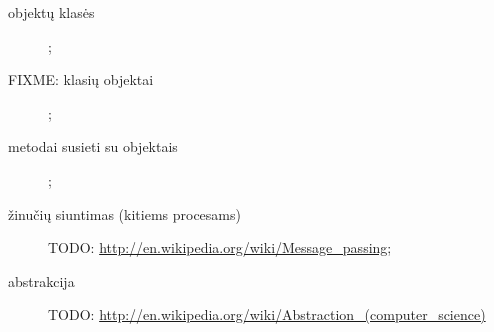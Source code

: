 \begin{description}
  \item[objektų klasės] ;
  \item[FIXME: klasių objektai] ;
  \item[metodai susieti su objektais] ;
  \item[žinučių siuntimas (kitiems procesams)] 
    TODO: \url{http://en.wikipedia.org/wiki/Message_passing};
  \item[abstrakcija] 
    TODO: \url{http://en.wikipedia.org/wiki/Abstraction_(computer_science)}
\end{description}
